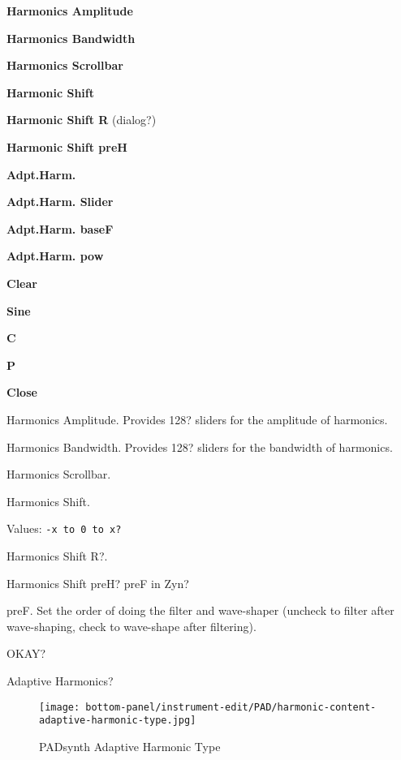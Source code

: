    \begin{enumber}
      \item \textbf{Harmonics Amplitude}
      \item \textbf{Harmonics Bandwidth}
      \item \textbf{Harmonics Scrollbar}
      \item \textbf{Harmonic Shift}
      \item \textbf{Harmonic Shift R} (dialog?)
      \item \textbf{Harmonic Shift preH}
      \item \textbf{Adpt.Harm.}
      \item \textbf{Adpt.Harm. Slider}
      \item \textbf{Adpt.Harm. baseF}
      \item \textbf{Adpt.Harm. pow}
      \item \textbf{Clear}
      \item \textbf{Sine}
      \item \textbf{C}
      \item \textbf{P}
      \item \textbf{Close}
   \end{enumber}

   Harmonics Amplitude.
   Provides 128? sliders for the amplitude of harmonics.

   Harmonics Bandwidth.
   Provides 128? sliders for the bandwidth of harmonics.

   Harmonics Scrollbar.

   Harmonics Shift.

   Values: \texttt{-x to 0 to x?}

   Harmonics Shift R?.

   Harmonics Shift preH?
   preF in Zyn?

   preF. Set the order of doing the filter and wave-shaper (uncheck to filter
   after wave-shaping, check to wave-shape after filtering).

   OKAY?

   Adaptive Harmonics?

\begin{figure}[H]
   \centering 
   \texttt{[image: bottom-panel/instrument-edit/PAD/harmonic-content-adaptive-harmonic-type.jpg]}
   \caption{PADsynth Adaptive Harmonic Type}
   \label{fig:padsynth_adaptive_harmonic_type}
\end{figure}

